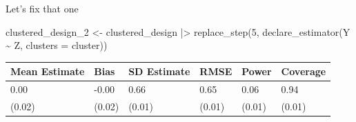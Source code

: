 \documentclass[
  11pt,
  ignorenonframetext,
]{beamer}
\newenvironment{Shaded}{\begin{snugshade}}{\end{snugshade}}
\newcommand{\AttributeTok}[1]{\textcolor[rgb]{0.40,0.45,0.13}{#1}}
\newcommand{\DecValTok}[1]{\textcolor[rgb]{0.68,0.00,0.00}{#1}}
\newcommand{\FunctionTok}[1]{\textcolor[rgb]{0.28,0.35,0.67}{#1}}
\newcommand{\NormalTok}[1]{\textcolor[rgb]{0.00,0.23,0.31}{#1}}
\newcommand{\OtherTok}[1]{\textcolor[rgb]{0.00,0.23,0.31}{#1}}
\newcommand{\SpecialCharTok}[1]{\textcolor[rgb]{0.37,0.37,0.37}{#1}}
\begin{document}
\begin{frame}[fragile]{Let's fix that one}
\protect\hypertarget{lets-fix-that-one}{}
\begin{Shaded}
\begin{Highlighting}[]
\NormalTok{clustered\_design\_2  }\OtherTok{\textless{}{-}}
\NormalTok{  clustered\_design }\SpecialCharTok{|\textgreater{}} \FunctionTok{replace\_step}\NormalTok{(}\DecValTok{5}\NormalTok{, }
  \FunctionTok{declare\_estimator}\NormalTok{(Y }\SpecialCharTok{\textasciitilde{}}\NormalTok{ Z, }\AttributeTok{clusters =}\NormalTok{ cluster))}
\end{Highlighting}
\end{Shaded}

\begin{tabular}{l|l|l|l|l|l}
\hline
Mean Estimate & Bias & SD Estimate & RMSE & Power & Coverage\\
\hline
0.00 & -0.00 & 0.66 & 0.65 & 0.06 & 0.94\\
\hline
(0.02) & (0.02) & (0.01) & (0.01) & (0.01) & (0.01)\\
\hline
\end{tabular}
\end{frame}
\end{document}
